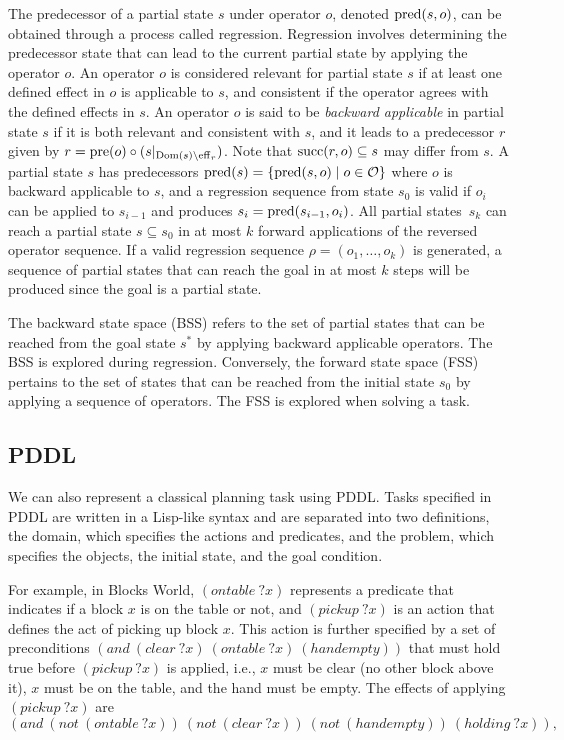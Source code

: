 \documentclass[ppgc,diss,english]{iiufrgs}
\begin{document}
The predecessor of a partial state $s$ under operator $o$, denoted $\operatorname{pred}(s,o)$, can be obtained through a process called regression. Regression involves determining the predecessor state that can lead to the current partial state by applying the operator $o$. An operator $o$ is considered relevant for partial state $s$ if at least one defined effect in $o$ is applicable to $s$, and consistent if the operator agrees with the defined effects in $s$. An operator $o$ is said to be \emph{backward applicable} in partial state $s$ if it is both relevant and consistent with $s$, and it leads to a predecessor $r$ given by $r=\operatorname{pre}(o)\circ (s|_{\operatorname{Dom}(s)\setminus\operatorname{eff}_r})$. Note that $\operatorname{succ}(r,o)\subseteq s$ may differ from $s$.
A partial state $s$ has predecessors $\operatorname{pred}(s)=\{{\operatorname{pred}(s,o)\mid o\in \mathcal{O}}\}$ where $o$ is backward applicable to $s$, and a regression sequence from state $s_0$ is valid if $o_i$ can be applied to $s_{i-1}$ and produces $s_i=\operatorname{pred}(s_{i-1},o_i)$. All partial states~$s_k$ can reach a partial state $s\subseteq s_0$ in at most $k$ forward applications of the reversed operator sequence.
If a valid regression sequence $\rho=(o_1,\ldots,o_k)$ is generated, a sequence of partial states that can reach the goal in at most $k$ steps will be produced since the goal is a partial state.

The backward state space (BSS) refers to the set of partial states that can be reached from the goal state $s^*$ by applying backward applicable operators. The BSS is explored during regression. Conversely, the forward state space (FSS) pertains to the set of states that can be reached from the initial state $s_0$ by applying a sequence of operators. The FSS is explored when solving a task.

\subsection{PDDL}
We can also represent a classical planning task using PDDL. Tasks specified in PDDL are written in a Lisp-like syntax and are separated into two definitions, the domain, which specifies the actions and predicates, and the problem, which specifies the objects, the initial state, and the goal condition.

For example, in Blocks World, $(ontable~?x)$ represents a predicate that indicates if a block $x$ is on the table or not, and $(pickup~?x)$ is an action that defines the act of picking up block $x$. This action is further specified by a set of preconditions $(and~(clear~?x)~(ontable~?x)~(handempty))$ that must hold true before $(pickup~?x)$ is applied, i.e., $x$ must be clear (no other block above it), $x$ must be on the table, and the hand must be empty. The effects of applying $(pickup~?x)$ are $$(and~(not~(ontable~?x))~(not~(clear~?x))~(not~(handempty))~(holding~?x)),$$
\end{document}
